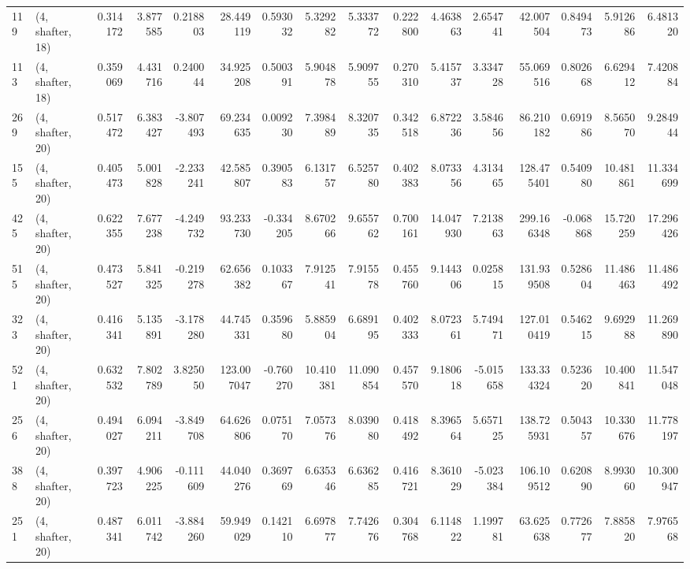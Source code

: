 \begin{tabular}{llrrrrrrrrrrrrrr}
119 &  (4, shafter, 18) &   0.314172 &   3.877585 &   0.218803 &    28.449119 &   0.593032 &   5.329282 &   5.333772 &  0.222800 &   4.463863 &   2.654741 &     42.007504 &   0.849473 &    5.912686 &    6.481320 \\
113 &  (4, shafter, 18) &   0.359069 &   4.431716 &   0.240044 &    34.925208 &   0.500391 &   5.904878 &   5.909755 &  0.270310 &   5.415737 &   3.334728 &     55.069516 &   0.802668 &    6.629412 &    7.420884 \\
269 &  (4, shafter, 20) &   0.517472 &   6.383427 &  -3.807493 &    69.234635 &   0.009230 &   7.398489 &   8.320735 &  0.342518 &   6.872236 &   3.584656 &     86.210182 &   0.691986 &    8.565070 &    9.284944 \\
155 &  (4, shafter, 20) &   0.405473 &   5.001828 &  -2.233241 &    42.585807 &   0.390583 &   6.131757 &   6.525780 &  0.402383 &   8.073356 &   4.313465 &    128.475401 &   0.540980 &   10.481861 &   11.334699 \\
425 &  (4, shafter, 20) &   0.622355 &   7.677238 &  -4.249732 &    93.233730 &  -0.334205 &   8.670266 &   9.655762 &  0.700161 &  14.047930 &   7.213863 &    299.166348 &  -0.068868 &   15.720259 &   17.296426 \\
515 &  (4, shafter, 20) &   0.473527 &   5.841325 &  -0.219278 &    62.656382 &   0.103367 &   7.912541 &   7.915578 &  0.455760 &   9.144306 &   0.025815 &    131.939508 &   0.528604 &   11.486463 &   11.486492 \\
323 &  (4, shafter, 20) &   0.416341 &   5.135891 &  -3.178280 &    44.745331 &   0.359680 &   5.885904 &   6.689195 &  0.402333 &   8.072361 &   5.749471 &    127.010419 &   0.546215 &    9.692988 &   11.269890 \\
521 &  (4, shafter, 20) &   0.632532 &   7.802789 &   3.825050 &   123.007047 &  -0.760270 &  10.410381 &  11.090854 &  0.457570 &   9.180618 &  -5.015658 &    133.334324 &   0.523620 &   10.400841 &   11.547048 \\
256 &  (4, shafter, 20) &   0.494027 &   6.094211 &  -3.849708 &    64.626806 &   0.075170 &   7.057376 &   8.039080 &  0.418492 &   8.396564 &   5.657125 &    138.725931 &   0.504357 &   10.330676 &   11.778197 \\
388 &  (4, shafter, 20) &   0.397723 &   4.906225 &  -0.111609 &    44.040276 &   0.369769 &   6.635346 &   6.636285 &  0.416721 &   8.361029 &  -5.023384 &    106.109512 &   0.620890 &    8.993060 &   10.300947 \\
251 &  (4, shafter, 20) &   0.487341 &   6.011742 &  -3.884260 &    59.949029 &   0.142110 &   6.697877 &   7.742676 &  0.304768 &   6.114822 &   1.199781 &     63.625638 &   0.772677 &    7.885820 &    7.976568 \\

\end{tabular}
